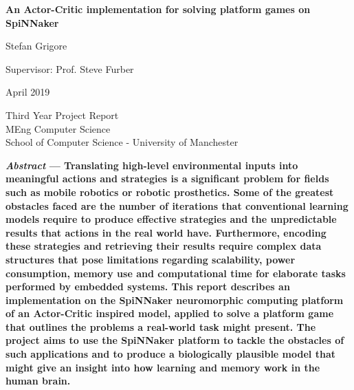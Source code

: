 \documentclass[10pt]{article}
\begin{document}
    
    \begin{titlepage}
        \begin{center}
        \vspace*{1cm}
    
        \Large
        \textbf{An Actor-Critic implementation for solving platform games on SpiNNaker}
    
        \vspace{0.5cm}
            Stefan Grigore
    
        \vspace{0.5cm} 
        
            Supervisor: Prof. Steve Furber

        \vspace{0.5cm} 

            April 2019
    
        \vspace{1.5cm}

        \vfill

        Third Year Project Report \\
        MEng Computer Science \\
        School of Computer Science - University of Manchester
     
        \end{center}
    \end{titlepage}

    \twocolumn
    
    \textbf{\textit{Abstract} --- Translating high-level environmental inputs into meaningful actions and strategies is a significant problem for fields such as mobile robotics or robotic prosthetics. Some of the greatest obstacles faced are the number of iterations that conventional learning models require to produce effective strategies and the unpredictable results that actions in the real world have. Furthermore, encoding these strategies and retrieving their results require complex data structures that pose limitations regarding scalability, power consumption, memory use and computational time for elaborate tasks performed by embedded systems. This report describes an implementation on the SpiNNaker neuromorphic computing platform of an Actor-Critic inspired model, applied to solve a platform game that outlines the problems a real-world task might present. The project aims to use the SpiNNaker platform to tackle the obstacles of such applications and to produce a biologically plausible model that might give an insight into how learning and memory work in the human brain.}
\end{document}
